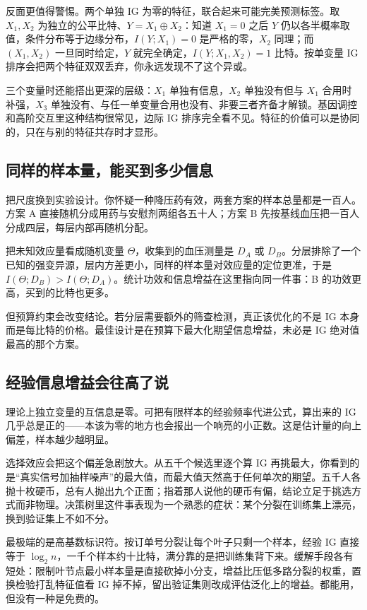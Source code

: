 反面更值得警惕。两个单独 IG 为零的特征，联合起来可能完美预测标签。取 \(X_1,X_2\) 为独立的公平比特、\(Y=X_1\oplus X_2\)：知道 \(X_1=0\) 之后 \(Y\) 仍以各半概率取值，条件分布等于边缘分布，\(I(Y;X_1)=0\) 是严格的零，\(X_2\) 同理；而 \((X_1,X_2)\) 一旦同时给定，\(Y\) 就完全确定，\(I(Y;X_1,X_2)=1\) 比特。按单变量 IG 排序会把两个特征双双丢弃，你永远发现不了这个异或。

三个变量时还能搭出更深的层级：\(X_1\) 单独有信息，\(X_2\) 单独没有但与 \(X_1\) 合用时补强，\(X_3\) 单独没有、与任一单变量合用也没有、非要三者齐备才解锁。基因调控和高阶交互里这种结构很常见，边际 IG 排序完全看不见。特征的价值可以是协同的，只在与别的特征共存时才显形。

\subsection{同样的样本量，能买到多少信息}

把尺度换到实验设计。你怀疑一种降压药有效，两套方案的样本总量都是一百人。方案 A 直接随机分成用药与安慰剂两组各五十人；方案 B 先按基线血压把一百人分成四层，每层内部再随机分配。

把未知效应量看成随机变量 \(\Theta\)，收集到的血压测量是 \(D_A\) 或 \(D_B\)。分层排除了一个已知的强变异源，层内方差更小，同样的样本量对效应量的定位更准，于是 \(I(\Theta;D_B)>I(\Theta;D_A)\)。统计功效和信息增益在这里指向同一件事：B 的功效更高，买到的比特也更多。

但预算约束会改变结论。若分层需要额外的筛查检测，真正该优化的不是 IG 本身而是每比特的价格。最佳设计是在预算下最大化期望信息增益，未必是 IG 绝对值最高的那个方案。

\subsection{经验信息增益会往高了说}

理论上独立变量的互信息是零。可把有限样本的经验频率代进公式，算出来的 IG 几乎总是正的——本该为零的地方也会报出一个响亮的小正数。这是估计量的向上偏差，样本越少越明显。

选择效应会把这个偏差急剧放大。从五千个候选里逐个算 IG 再挑最大，你看到的是``真实信号加抽样噪声''的最大值，而最大值天然高于任何单次的期望。五千人各抛十枚硬币，总有人抛出九个正面；指着那人说他的硬币有偏，结论立足于挑选方式而非物理。决策树里这件事表现为一个熟悉的症状：某个分裂在训练集上漂亮，换到验证集上不如不分。

最极端的是高基数标识符。按订单号分裂让每个叶子只剩一个样本，经验 IG 直接等于 \(\log_2 n\)，一千个样本约十比特，满分靠的是把训练集背下来。缓解手段各有短处：限制叶节点最小样本量是直接砍掉小分支，增益比压低多路分裂的权重，置换检验打乱特征值看 IG 掉不掉，留出验证集则改成评估泛化上的增益。都能用，但没有一种是免费的。

